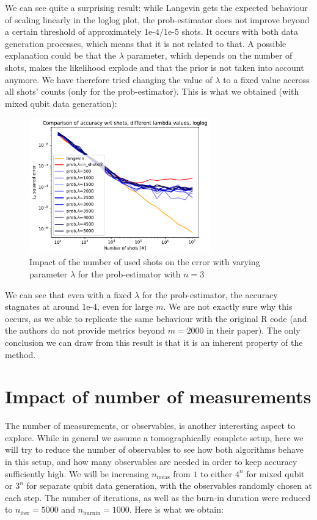 \documentclass[12pt]{memoir}
\newcommand{\nitern}[1]{$n_{\text{iter}}=#1$}
\newcommand{\nburninn}[1]{$n_{\text{burnin}}=#1$}
\newcommand{\nmeas}[0]{$n_{\text{meas}} $ }
\begin{document}
We can see quite a surprising result: while Langevin gets the expected behaviour of scaling linearly in the loglog plot, the prob-estimator does not improve beyond a certain threshold of approximately $1\text{e-}4/1\text{e-}5$ shots. It occurs with both data generation processes, which means that it is not related to that. A possible explanation could be that the $\lambda$ parameter, which depends on the number of shots, makes the likelihood explode and that the prior is not taken into account anymore. We have therefore tried changing the value of $\lambda$ to a fixed value accross all shots' counts (only for the prob-estimator). This is what we obtained (with mixed qubit data generation):

\begin{figure}[H]
    \centering
    \includegraphics[width=0.7\textwidth]{figures/experiments/shots/shots_acc_comp_shots_exp_lambda_prob_with_var_lambda_loglog-1.png}
    \caption{Impact of the number of used shots on the error with varying parameter $\lambda$ for the prob-estimator with $n=3$}
    \label{fig:shots-comp-prob-var-lambda}
\end{figure}

We can see that even with a fixed $\lambda$ for the prob-estimator, the accuracy stagnates at around $1\text{e-}4$, even for large $m$. We are not exactly sure why this occurs, as we able to replicate the same behaviour with the original R code (and the authors do not provide metrics beyond $m=2000$ in their paper). The only conclusion we can draw from this result is that it is an inherent property of the method.

\section{Impact of number of measurements}\label{section:comp-nb-meas}
The number of measurements, or observables, is another interesting aspect to explore. While in general we assume a tomographically complete setup, here we will try to reduce the number of observables to see how both algorithms behave in this setup, and how many observables are needed in order to keep accuracy sufficiently high. We will be increasing \nmeas  from $1$ to either $4^n$ for mixed qubit or $3^n$ for separate qubit data generation, with the observables randomly chosen at each step. The number of iterations, as well as the burn-in duration were reduced to \nitern{5000} and \nburninn{1000}. Here is what we obtain:
\end{document}
